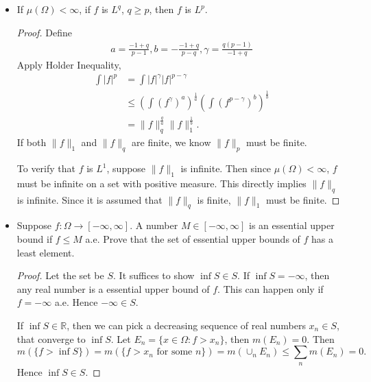 
\begin{itemize}
	\item If $\mu(\Omega) < \infty $, if $f$ is $L^q$, $q \ge p$, then $f$ is $L^p$.
\begin{proof}
	Define
		\begin{align*}
a=\frac{-1+q}{p-1}, b=-\frac{-1+q}{p-q}, \gamma=\frac{q(p-1)}{-1+q}
\end{align*}
Apply Holder Inequality,
\begin{align*}
	\int |f|^p
	&= \int |f|^\gamma |f|^{p - \gamma} \\
	&\le \left( \int (f^\gamma)^a \right)^{\frac{1}{a}}\left( \int (f^{p - \gamma})^b \right)^{\frac{1}{b}}  \\
	&= \|f\|_q^{\frac{q}{a}} \|f\|_1^{\frac{1}{b}}
.\end{align*}
If both $\|f\|_1$ and $\|f\|_q$ are finite, we know $\|f\|_p$ must be finite. 

To verify that $f$ is $L^1$, suppose $\|f\|_1$ is infinite. Then since  $\mu(\Omega) < \infty $, $f$ must be infinite on a set with positive measure. This directly implies $\|f\|_{q}$ is infinite. Since it is assumed that $\|f\|_q$ is finite, $\|f\|_1$ must be finite.
\end{proof}

\item Suppose  $f: \Omega \to  [-\infty , \infty ]$. A number $M \in [-\infty, \infty]$ is an essential upper bound if $f \le M$ a.e. Prove that the set of essential upper bounds of $f$ has a least element.
\begin{proof}
	Let the set be $S$. It suffices to show $\inf S \in S$. If $\inf S = - \infty $, then any real number is a essential upper bound of $f$. This can happen only if $f = - \infty $ a.e. Hence $- \infty \in S$.

	If $\inf  S  \in \mathbb{R}$, then we can pick a decreasing sequence of real numbers $x_n \in S$, that converge to $\inf  S$. Let $E_n = \{x \in \Omega: f > x_n\} $, then $m(E_n) = 0$. Then
	 \[
		m\left( \{f > \inf  S\}  \right) 
	=m\left( \{f > x_n \text{ for some } n\} \right) 
	= m\left( \cup_n E_n   \right) 
	\le \sum_n m(E_n) = 0
	.\] 
	Hence $\inf  S \in S$.


\end{proof}
\end{itemize}
